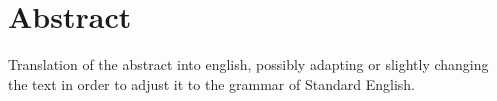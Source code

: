 

\chapter{Abstract}\label{sec:abstract}
Translation of the abstract into english, possibly adapting or slightly changing the text in order to adjust it to the grammar of Standard English.




